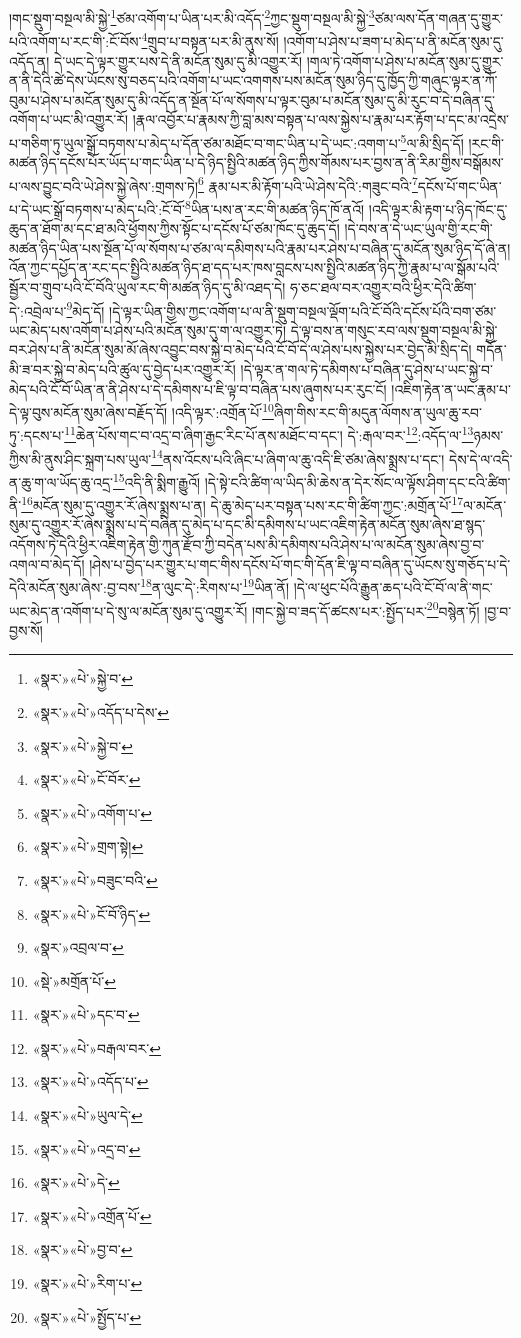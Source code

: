 །གང་སྡུག་བསྔལ་མི་སྐྱེ་\footnote{«སྣར་»«པེ་»སྐྱེ་བ་}ཙམ་འགོག་པ་ཡིན་པར་མི་འདོད་\footnote{«སྣར་»«པེ་»འདོད་པ་དེས་}ཀྱང་སྡུག་བསྔལ་མི་སྐྱེ་\footnote{«སྣར་»«པེ་»སྐྱེ་བ་}ཙམ་ལས་དོན་གཞན་དུ་གྱུར་པའི་འགོག་པ་རང་གི་:ངོ་བོས་\footnote{«སྣར་»«པེ་»ངོ་བོར་}གྲུབ་པ་བསྟན་པར་མི་ནུས་སོ། །འགོག་པ་ཤེས་པ་ཟག་པ་མེད་པ་ནི་མངོན་སུམ་དུ་འདོད་ན། དེ་ཡང་དེ་ལྟར་གྱུར་པས་དེ་ནི་མངོན་སུམ་དུ་མི་འགྱུར་རོ། །གལ་ཏེ་འགོག་པ་ཤེས་པ་མངོན་སུམ་དུ་གྱུར་ན་ནི་དེའི་ཚེ་དེས་ཡོངས་སུ་བཅད་པའི་འགོག་པ་ཡང་འགགས་པས་མངོན་སུམ་ཉིད་དུ་ཁྱོད་ཀྱི་གཞུང་ལྟར་ན་ཀོ་བུམ་པ་ཤེས་པ་མངོན་སུམ་དུ་མི་འདོད་ན་སྔོན་པོ་ལ་སོགས་པ་ལྟར་བུམ་པ་མངོན་སུམ་དུ་མི་རུང་བ་དེ་བཞིན་དུ་འགོག་པ་ཡང་མི་འགྱུར་རོ། །རྣལ་འབྱོར་པ་རྣམས་ཀྱི་བླ་མས་བསྟན་པ་ལས་སྐྱེས་པ་རྣམ་པར་རྟོག་པ་དང་མ་འདྲེས་པ་གཅིག་ཏུ་ཡུལ་སྒྲོ་བཏགས་པ་མེད་པ་དོན་ཙམ་མཐོང་བ་གང་ཡིན་པ་དེ་ཡང་:འགག་པ་\footnote{«སྣར་»«པེ་»འགོག་པ་}ལ་མི་སྲིད་དོ། །རང་གི་མཚན་ཉིད་དངོས་པོར་ཡོད་པ་གང་ཡིན་པ་དེ་ཉིད་སྤྱིའི་མཚན་ཉིད་ཀྱིས་གོམས་པར་བྱས་ན་ནི་རིམ་གྱིས་བསྒོམས་པ་ལས་བྱུང་བའི་ཡེ་ཤེས་སྐྱེ་ཞེས་:གྲགས་ཏེ།\footnote{«སྣར་»«པེ་»གྲག་སྟེ།} རྣམ་པར་མི་རྟོག་པའི་ཡེ་ཤེས་དེའི་:གཟུང་བའི་\footnote{«སྣར་»«པེ་»བཟུང་བའི་}དངོས་པོ་གང་ཡིན་པ་དེ་ཡང་སྒྲོ་བཏགས་པ་མེད་པའི་:ངོ་བོ་\footnote{«སྣར་»«པེ་»ངོ་བོ་ཉིད་}ཡིན་པས་ན་རང་གི་མཚན་ཉིད་ཁོ་ནའོ། །འདི་ལྟར་མི་རྟག་པ་ཉིད་ཁོང་དུ་ཆུད་ན་ཐོག་མ་དང་ཐ་མའི་ཕྱོགས་ཀྱིས་སྟོང་པ་དངོས་པོ་ཙམ་ཁོང་དུ་ཆུད་དོ། །དེ་བས་ན་དེ་ཡང་ཡུལ་གྱི་རང་གི་མཚན་ཉིད་ཡིན་པས་སྔོན་པོ་ལ་སོགས་པ་ཙམ་ལ་དམིགས་པའི་རྣམ་པར་ཤེས་པ་བཞིན་དུ་མངོན་སུམ་ཉིད་དོ་ཞེ་ན། འོན་ཀྱང་དཔྱོད་ན་རང་དང་སྤྱིའི་མཚན་ཉིད་ཐ་དད་པར་ཁས་བླངས་པས་སྤྱིའི་མཚན་ཉིད་ཀྱི་རྣམ་པ་ལ་སྒོམ་པའི་སྦྱོར་བ་གྲུབ་པའི་ངོ་བོའི་ཡུལ་རང་གི་མཚན་ཉིད་དུ་མི་འཐད་དེ། ཧ་ཅང་ཐལ་བར་འགྱུར་བའི་ཕྱིར་དེའི་ཚིག་དེ་:འབྲེལ་པ་\footnote{«སྣར་»འབྲལ་བ་}མེད་དོ། །དེ་ལྟར་ཡིན་གྱིས་ཀྱང་འགོག་པ་ལ་ནི་སྡུག་བསྔལ་ལྡོག་པའི་ངོ་བོའི་དངོས་པོའི་བག་ཙམ་ཡང་མེད་པས་འགོག་པ་ཤེས་པའི་མངོན་སུམ་དུ་ག་ལ་འགྱུར་ཏེ། དེ་ལྟ་བས་ན་གསུང་རབ་ལས་སྡུག་བསྔལ་མི་སྐྱེ་བར་ཤེས་པ་ནི་མངོན་སུམ་མོ་ཞེས་འབྱུང་བས་སྐྱེ་བ་མེད་པའི་ངོ་བོ་དེ་ལ་ཤེས་པས་སྐྱེས་པར་བྱེད་མི་སྲིད་དེ། གདོན་མི་ཟ་བར་སྐྱེ་བ་མེད་པའི་ཚུལ་དུ་བྱེད་པར་འགྱུར་རོ། །དེ་ལྟར་ན་གལ་ཏེ་དམིགས་པ་བཞིན་དུ་ཤེས་པ་ཡང་སྐྱེ་བ་མེད་པའི་ངོ་བོ་ཡིན་ན་ནི་ཤེས་པ་དེ་དམིགས་པ་ཇི་ལྟ་བ་བཞིན་པས་ཞུགས་པར་རུང་ངོ། །འཇིག་རྟེན་ན་ཡང་རྣམ་པ་དེ་ལྟ་བུས་མངོན་སུམ་ཞེས་བརྗོད་དོ། །འདི་ལྟར་:འགྲོན་པོ་\footnote{«སྡེ་»མགྲོན་པོ་}ཞིག་གིས་རང་གི་མདུན་ལོགས་ན་ཡུལ་ཆུ་རབ་ཏུ་:དངས་པ་\footnote{«སྣར་»«པེ་»དང་བ་}ཆེན་པོས་གང་བ་འདྲ་བ་ཞིག་རྒྱང་རིང་པོ་ནས་མཐོང་བ་དང་། དེ་:རྒལ་བར་\footnote{«སྣར་»«པེ་»བརྒལ་བར་}:འདོད་ལ་\footnote{«སྣར་»«པེ་»འདོད་པ་}ཉམས་ཀྱིས་མི་ནུས་ཤིང་སྐྲག་པས་ཡུལ་\footnote{«སྣར་»«པེ་»ཡུལ་དེ་}ནས་འོངས་པའི་ཞིང་པ་ཞིག་ལ་ཆུ་འདི་ཇི་ཙམ་ཞེས་སྨྲས་པ་དང་། དེས་དེ་ལ་འདི་ན་ཆུ་ག་ལ་ཡོད་ཆུ་འདྲ་\footnote{«སྣར་»«པེ་»འདྲ་བ་}འདི་ནི་སྨིག་རྒྱུའོ། །དེ་སྟེ་ངའི་ཚིག་ལ་ཡིད་མི་ཆེས་ན་དེར་སོང་ལ་ལྟོས་ཤིག་དང་ངའི་ཚིག་ནི་\footnote{«སྣར་»«པེ་»དེ་}མངོན་སུམ་དུ་འགྱུར་རོ་ཞེས་སྨྲས་པ་ན། དེ་ཆུ་མེད་པར་བསྟན་པས་རང་གི་ཚིག་ཀྱང་:མགྲོན་པོ་\footnote{«སྣར་»«པེ་»འགྲོན་པོ་}ལ་མངོན་སུམ་དུ་འགྱུར་རོ་ཞེས་སྨྲས་པ་དེ་བཞིན་དུ་མེད་པ་དང་མི་དམིགས་པ་ཡང་འཇིག་རྟེན་མངོན་སུམ་ཞེས་ཐ་སྙད་འདོགས་ཏེ་དེའི་ཕྱིར་འཇིག་རྟེན་གྱི་ཀུན་རྫོབ་ཀྱི་བདེན་པས་མི་དམིགས་པའི་ཤེས་པ་ལ་མངོན་སུམ་ཞེས་བྱ་བ་འགལ་བ་མེད་དོ། །ཤེས་པ་བྱེད་པར་གྱུར་པ་གང་གིས་དངོས་པོ་གང་གི་དོན་ཇི་ལྟ་བ་བཞིན་དུ་ཡོངས་སུ་གཅོད་པ་དེ་དེའི་མངོན་སུམ་ཞེས་:བྱ་བས་\footnote{«སྣར་»«པེ་»བྱ་བ་}ན་ལུང་དེ་:རིགས་པ་\footnote{«སྣར་»«པེ་»རིག་པ་}ཡིན་ནོ། །དེ་ལ་ཕུང་པོའི་རྒྱུན་ཆད་པའི་ངོ་བོ་ལ་ནི་གང་ཡང་མེད་ན་འགོག་པ་དེ་སུ་ལ་མངོན་སུམ་དུ་འགྱུར་རོ། །གང་སྐྱེ་བ་ཟད་དོ་ཚངས་པར་:སྤྱོད་པར་\footnote{«སྣར་»«པེ་»སྤྱོད་པ་}བསྙེན་ཏོ། །བྱ་བ་བྱས་སོ། 